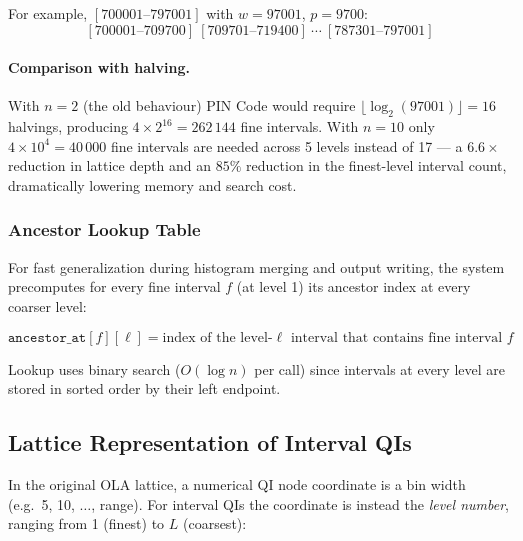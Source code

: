 \documentclass[12pt,a4paper]{article}
\begin{document}
For example, $[700001\text{--}797001]$ with $w{=}97001$, $p{=}9700$:
\[
  [700001\text{--}709700]\ [709701\text{--}719400]\ \cdots\ [787301\text{--}797001]
\]

\paragraph{Comparison with halving.}
With $n{=}2$ (the old behaviour) PIN Code would require
$\lfloor\log_2(97001)\rfloor = 16$ halvings, producing $4 \times 2^{16} = 262\,144$
fine intervals. With $n{=}10$ only $4 \times 10^4 = 40\,000$ fine intervals are
needed across 5 levels instead of 17 — a $6.6\times$ reduction in lattice depth
and an $85\%$ reduction in the finest-level interval count, dramatically lowering
memory and search cost.

\subsubsection{Ancestor Lookup Table}

For fast generalization during histogram merging and output writing, the
system precomputes for every fine interval $f$ (at level 1) its ancestor
index at every coarser level:

\[
  \texttt{ancestor\_at}[f][\ell] = \text{index of the level-}\ell
  \text{ interval that contains fine interval }f
\]

Lookup uses binary search ($O(\log n)$ per call) since intervals at every
level are stored in sorted order by their left endpoint.

\subsection{Lattice Representation of Interval QIs}

In the original OLA lattice, a numerical QI node coordinate is a bin width
(e.g.\ 5, 10, $\ldots$, range). For interval QIs the coordinate is instead
the \emph{level number}, ranging from 1 (finest) to $L$ (coarsest):

\begin{center}
\end{center}
\end{document}
